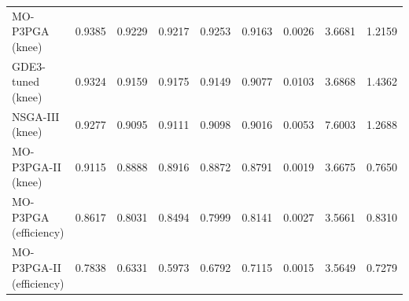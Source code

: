 \begin{table}[htbp]
\begin{tabular}{lrrrrrrrr}
MO-P3PGA (knee) & 0.9385 & 0.9229 & 0.9217 & 0.9253 & 0.9163 & 0.0026 & 3.6681 & 1.2159 \\
GDE3-tuned (knee) & 0.9324 & 0.9159 & 0.9175 & 0.9149 & 0.9077 & 0.0103 & 3.6868 & 1.4362 \\
NSGA-III (knee) & 0.9277 & 0.9095 & 0.9111 & 0.9098 & 0.9016 & 0.0053 & 7.6003 & 1.2688 \\
MO-P3PGA-II (knee) & 0.9115 & 0.8888 & 0.8916 & 0.8872 & 0.8791 & 0.0019 & 3.6675 & 0.7650 \\
MO-P3PGA (efficiency) & 0.8617 & 0.8031 & 0.8494 & 0.7999 & 0.8141 & 0.0027 & 3.5661 & 0.8310 \\
MO-P3PGA-II (efficiency) & 0.7838 & 0.6331 & 0.5973 & 0.6792 & 0.7115 & 0.0015 & 3.5649 & 0.7279 \\
\bottomrule
\end{tabular}
\end{table}
